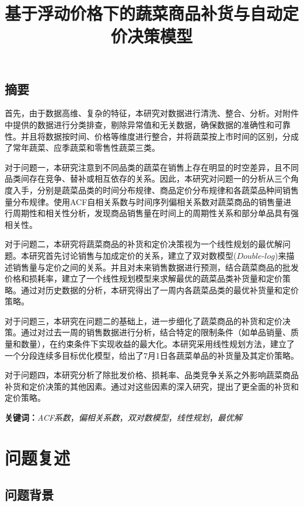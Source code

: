 \documentclass{article}
\title{\large 基于浮动价格下的蔬菜商品补货与自动定价决策模型}
\date{}
\begin{document}
\maketitle
\begin{center}
\section*{摘要}
\end{center}
\vspace{-1em}
\noindent
首先，由于数据高维、复杂的特征，本研究对数据进行清洗、整合、分析。对附件中提供的数据进行分类排查，剔除异常值和无关数据，确保数据的准确性和可靠性。并且将数据按时间、价格等维度进行整合，并将蔬菜按上市时间的区别，分成了常年蔬菜、应季蔬菜和零售性蔬菜三类。

对于问题一，本研究注意到不同品类的蔬菜在销售上存在明显的时空差异，且不同品类间存在竞争、替补或相互依存的关系。因此，本研究对问题一的分析从三个角度入手，分别是蔬菜品类的时间分布规律、商品定价分布规律和各蔬菜品种间销售量分布规律。使用ACF自相关系数与时间序列偏相关系数对蔬菜商品的销售量进行周期性和相关性分析，发现商品销售量在时间上的周期性关系和部分单品具有强相关性。

对于问题二，本研究将蔬菜商品的补货和定价决策视为一个线性规划的最优解问题。本研究首先讨论销售与加成定价的关系，建立了双对数模型($Double$-$log$)来描述销售量与定价之间的关系。并且对未来销售数据进行预测，结合蔬菜商品的批发价格和损耗率，建立了一个线性规划模型来求解最优的蔬菜品类补货量和定价策略。通过对历史数据的分析，本研究得出了一周内各蔬菜品类的最优补货量和定价策略。

对于问题三，本研究在问题二的基础上，进一步细化了蔬菜商品的补货和定价决策。通过对过去一周的销售数据进行分析，结合特定的限制条件（如单品销量、质量和数量），在约束条件下实现收益的最大化。本研究采用线性规划方法，建立了一个分段连续多目标优化模型，给出了7月1日各蔬菜单品的补货量及其定价策略。

对于问题四，本研究分析了除批发价格、损耗率、品类竞争关系之外影响蔬菜商品补货和定价决策的其他因素。通过对这些因素的深入研究，提出了更全面的补货和定价策略。

\noindent
\textbf{关键词：}\textit{ACF系数}，\textit{偏相关系数}，\textit{双对数模型}，\textit{线性规划}，\textit{最优解}

\section{问题复述}

\subsection{问题背景}
\end{document}
